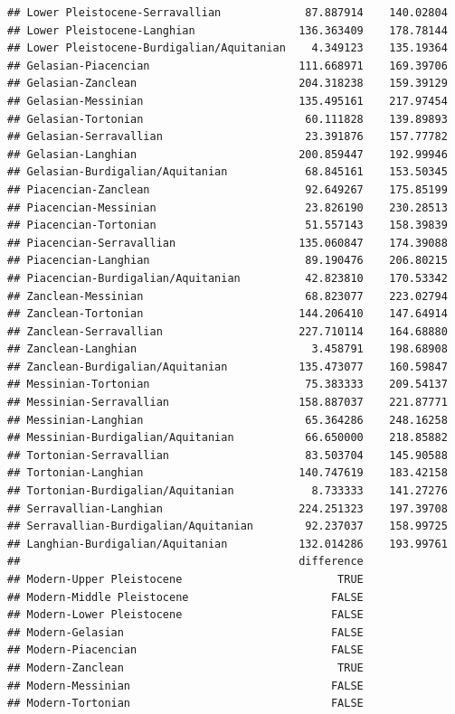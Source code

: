 \documentclass[]{article}
\begin{document}
\begin{verbatim}
## Lower Pleistocene-Serravallian             87.887914    140.02804
## Lower Pleistocene-Langhian                136.363409    178.78144
## Lower Pleistocene-Burdigalian/Aquitanian    4.349123    135.19364
## Gelasian-Piacencian                       111.668971    169.39706
## Gelasian-Zanclean                         204.318238    159.39129
## Gelasian-Messinian                        135.495161    217.97454
## Gelasian-Tortonian                         60.111828    139.89893
## Gelasian-Serravallian                      23.391876    157.77782
## Gelasian-Langhian                         200.859447    192.99946
## Gelasian-Burdigalian/Aquitanian            68.845161    153.50345
## Piacencian-Zanclean                        92.649267    175.85199
## Piacencian-Messinian                       23.826190    230.28513
## Piacencian-Tortonian                       51.557143    158.39839
## Piacencian-Serravallian                   135.060847    174.39088
## Piacencian-Langhian                        89.190476    206.80215
## Piacencian-Burdigalian/Aquitanian          42.823810    170.53342
## Zanclean-Messinian                         68.823077    223.02794
## Zanclean-Tortonian                        144.206410    147.64914
## Zanclean-Serravallian                     227.710114    164.68880
## Zanclean-Langhian                           3.458791    198.68908
## Zanclean-Burdigalian/Aquitanian           135.473077    160.59847
## Messinian-Tortonian                        75.383333    209.54137
## Messinian-Serravallian                    158.887037    221.87771
## Messinian-Langhian                         65.364286    248.16258
## Messinian-Burdigalian/Aquitanian           66.650000    218.85882
## Tortonian-Serravallian                     83.503704    145.90588
## Tortonian-Langhian                        140.747619    183.42158
## Tortonian-Burdigalian/Aquitanian            8.733333    141.27276
## Serravallian-Langhian                     224.251323    197.39708
## Serravallian-Burdigalian/Aquitanian        92.237037    158.99725
## Langhian-Burdigalian/Aquitanian           132.014286    193.99761
##                                           difference
## Modern-Upper Pleistocene                        TRUE
## Modern-Middle Pleistocene                      FALSE
## Modern-Lower Pleistocene                       FALSE
## Modern-Gelasian                                FALSE
## Modern-Piacencian                              FALSE
## Modern-Zanclean                                 TRUE
## Modern-Messinian                               FALSE
## Modern-Tortonian                               FALSE

\end{verbatim}
\end{document}
